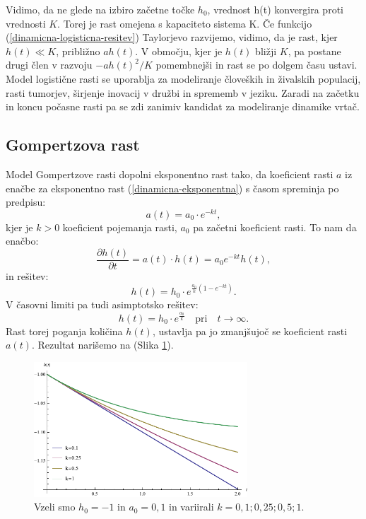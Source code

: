 \documentclass[a4paper, twoside, 12pt]{book}
\begin{document}
    Vidimo, da ne glede na izbiro začetne točke $h_0$, vrednost h(t) konvergira proti vrednosti $K$. Torej je rast omejena s kapaciteto sistema K.
    Če funkcijo (\ref{dinamicna-logisticna-resitev}) Taylorjevo razvijemo, vidimo, da je rast, kjer $h(t) \ll K$, približno $a h(t)$. V območju, kjer je $h(t)$ bližji $K$, pa postane drugi člen v razvoju $-a h(t)^2 / K$ pomembnejši in rast se po dolgem času ustavi.\\
    Model logistične rasti se uporablja za modeliranje človeških in živalskih populacij, rasti tumorjev, širjenje inovacij v družbi in sprememb v jeziku. Zaradi na začetku in koncu počasne rasti pa se zdi zanimiv kandidat za modeliranje dinamike vrtač.


    \subsection{Gompertzova rast}

    Model Gompertzove rasti dopolni eksponentno rast tako, da koeficient rasti $a$ iz enačbe za eksponentno rast (\ref{dinamicna-eksponentna}) s časom spreminja po predpisu:
    \begin{equation}
      a(t) = a_0 \cdot e^{- k t},
      \label{dinamicna-gompertzova-faktor}
    \end{equation}
kjer je $k > 0$ koeficient pojemanja rasti, $a_0$ pa začetni koeficient rasti.
To nam da enačbo:
    \begin{equation}
      \frac{\partial h(t)}{\partial t} = a(t) \cdot h(t) = a_0 e^{ -k t} h(t),
      \label{dinamicna-gompertzova}
    \end{equation}
in rešitev:
    \begin{equation}
      h(t) = h_0 \cdot e^{\frac{a_0}{k}(1-e^{-kt})}.
      \label{dinamicna-gompertzova-resitev}
    \end{equation}
V časovni limiti pa tudi asimptotsko rešitev:
    \begin{equation}
      h(t) = h_0 \cdot e^{\frac{a_0}{k}} \quad \text{pri} \quad t \rightarrow \infty.
      \label{dinamicna-gompertzova-limita}
    \end{equation}
Rast torej poganja količina $h(t)$, ustavlja pa jo zmanjšujoč se koeficient rasti $a(t)$. Rezultat narišemo na (Slika \ref{fig:gompertzova-rast}).

    \begin{figure}[h!]
      \begin{center}
        \includegraphics[width=8cm]{slike/gompertzova-rast}
      \end{center}
      \caption{Vzeli smo $h_0=-1$ in $a_0=0,1$ in variirali $k=0,1;0,25;0,5;1$.}
      \label{fig:gompertzova-rast}
    \end{figure}
\end{document}
